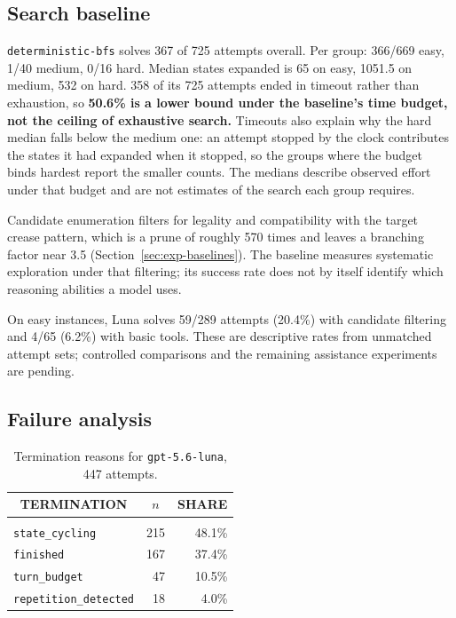 \subsection{Search baseline}
\label{sec:results-baseline}



\texttt{deterministic-bfs} solves 367 of 725 attempts overall. Per group: 366/669 easy, 1/40 medium,
0/16 hard. Median states expanded is 65 on easy, 1051.5 on medium, 532 on hard. 358%
of its 725 attempts ended in timeout rather than exhaustion, so \textbf{50.6\% is a lower bound
under the baseline's time budget, not the ceiling of exhaustive search.} Timeouts also explain why
the hard median falls below the medium one: an attempt stopped by the clock contributes the states
it had expanded when it stopped, so the groups where the budget binds hardest report the smaller
counts. The medians describe observed effort under that budget and are not estimates of the search
each group requires.

Candidate enumeration filters for legality and compatibility with the target crease pattern, which
is a prune of roughly 570 times and leaves a branching factor near 3.5
(Section~\ref{sec:exp-baselines}). The baseline measures systematic exploration under that
filtering; its success rate does not by itself identify which reasoning abilities a model uses.

\label{sec:results-tiers}

On easy instances, Luna solves 59/289 attempts (20.4\%) with candidate filtering and 4/65
(6.2\%) with basic tools. These are descriptive rates from unmatched attempt sets; controlled
comparisons and the remaining assistance experiments are pending.

\subsection{Failure analysis}
\label{sec:results-failures}

\begin{table}[h]
\caption{Termination reasons for \texttt{gpt-5.6-luna}, 447 attempts.}
\label{tab:terminations}
\begin{center}
\begin{tabular}{lrr}
\multicolumn{1}{c}{\bf TERMINATION} &\multicolumn{1}{c}{\bf $n$} &\multicolumn{1}{c}{\bf SHARE} \\
\hline \\
\texttt{state\_cycling}       & 215 & 48.1\% \\
\texttt{finished}             & 167 & 37.4\% \\
\texttt{turn\_budget}         & 47  & 10.5\% \\
\texttt{repetition\_detected} & 18  & 4.0\% \\
\end{tabular}
\end{center}
\end{table}

